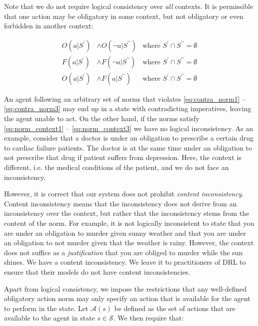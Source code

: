 Note that we do not require logical consistency over \emph{all} contexts. It is permissible that one action may be obligatory in some context, but not obligatory or even forbidden in another context:

\begin{align}
 	O(a | S^{\prime}) &\wedge O(\neg a | S^{\prime\prime})  &\text{where } S^{\prime} \cap S^{\prime\prime} = \emptyset \label{eq:norm_context1}\\
 	F(a | S^{\prime}) &\wedge F(\neg a | S^{\prime\prime})  &\text{where } S^{\prime} \cap S^{\prime\prime} = \emptyset \label{eq:norm_context2}\\
 	O(a | S^{\prime}) &\wedge F(a | S^{\prime\prime})  &\text{where } S^{\prime} \cap S^{\prime\prime} = \emptyset \label{eq:norm_context3}
\end{align} 

An agent following an arbitrary set of norms that violates \eqref{eq:contra_norm1} -- \eqref{eq:contra_norm3} may end up in a state with contradicting imperatives, leaving the agent unable to act. On the other hand, if the norms satisfy \eqref{eq:norm_context1} -- \eqref{eq:norm_context3} we have no logical inconsistency. As an example, consider that a doctor is under an obligation to prescribe a certain drug to cardiac failure patients. The doctor is at the same time under an obligation to not prescribe that drug if patient suffers from depression. Here, the context is different, i.e. the medical conditions of the patient, and we do not face an inconsistency. 

However, it is correct that our system does not prohibit \emph{content inconsistency}. Content inconsistency means that the inconsistency does not derive from an inconsistency over the context, but rather that the inconsistency stems from the content of the norm. For example, it is not logically inconsistent to state that you are under an obligation to murder given sunny weather and that you are under an obligation to not murder given that the weather is rainy. However, the context does not suffice as a \emph{justification} that you are obliged to murder while the sun shines. We have a content inconsistency. We leave it to practitioners of DRL to ensure that their models do not have content inconsistencies.  

Apart from logical consistency, we impose the restrictions that any well-defined obligatory action norm may only specify an action that is available for the agent to perform in the state. Let $\mathcal{A}(s)$ be defined as the set of actions that are available to the agent in state $s \in \mathcal{S}$. We then require that:

